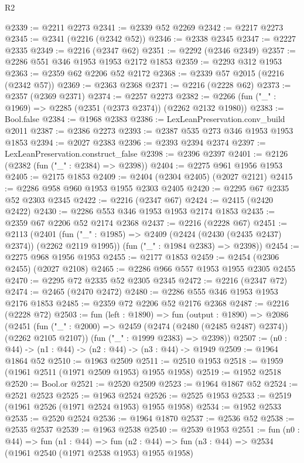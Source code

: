 \begin{lexlean}{R2}
\begin{coremodule}
@2339 := @2211 @2273
@2341 := @2339 @52 @2269
@2342 := @2217 @2273
@2345 := @2341 (@2216 (@2342 @52))
@2346 := @2338 @2345
@2347 := @2227 @2335
@2349 := @2216 (@2347 @62)
@2351 := @2292 (@2346 @2349)
@2357 := @2286 @551 @346 @1953 @1953 @2172 @1853
@2359 := @2293 @312 @1953
@2363 := @2359 @62 @2206 @52 @2172
@2368 := @2339 @57 @2015 (@2216 (@2342 @57))
@2369 := @2363 @2368
@2371 := @2216 (@2228 @62)
@2373 := @2357 (@2369 @2371)
@2374 := @2257 @2273
@2382 := @2266 (fun ("_" : @1969) => @2285 (@2351 (@2373 @2374)) (@2262 @2132 @1980))
@2383 := Bool.false
@2384 := @1968 @2383
@2386 := LexLeanPreservation.conv_build @2011
@2387 := @2386 @2273
@2393 := @2387 @535 @273 @346 @1953 @1953 @1853
@2394 := @2027 @2383
@2396 := @2393 @2394 @2374
@2397 := LexLeanPreservation.construct_false
@2398 := @2396 @2397
@2401 := @2126 (@2382 (fun ("_" : @2384) => @2398))
@2404 := @2275 @961 @1956 @1953
@2405 := @2175 @1853
@2409 := @2404 (@2304 @2405) (@2027 @2121)
@2415 := @2286 @958 @960 @1953 @1955 @2303 @2405
@2420 := @2295 @67 @2335 @52 @2303 @2345
@2422 := @2216 (@2347 @67)
@2424 := @2415 (@2420 @2422)
@2430 := @2286 @553 @346 @1953 @1953 @2174 @1853
@2435 := @2359 @67 @2206 @52 @2174 @2368
@2437 := @2216 (@2228 @67)
@2451 := @2113
    (@2401
      (fun ("_" : @1985) => @2409 (@2424 (@2430 (@2435 @2437) @2374)) (@2262 @2119 @1995))
      (fun ("_" : @1984 @2383) => @2398))
@2454 := @2275 @968 @1956 @1953
@2455 := @2177 @1853
@2459 := @2454 (@2306 @2455) (@2027 @2108)
@2465 := @2286 @966 @557 @1953 @1955 @2305 @2455
@2470 := @2295 @72 @2335 @52 @2305 @2345
@2472 := @2216 (@2347 @72)
@2474 := @2465 (@2470 @2472)
@2480 := @2286 @555 @346 @1953 @1953 @2176 @1853
@2485 := @2359 @72 @2206 @52 @2176 @2368
@2487 := @2216 (@2228 @72)
@2503 := fun (left : @1890) =>
  fun (output : @1890) =>
  @2086
    (@2451
      (fun ("_" : @2000) => @2459 (@2474 (@2480 (@2485 @2487) @2374)) (@2262 @2105 @2107))
      (fun ("_" : @1999 @2383) => @2398))
@2507 := (n0 : @44) -> (n1 : @44) -> (n2 : @44) -> (n3 : @44) -> @1949
@2509 := @1964 @1864 @52
@2510 := @1963 @2509
@2511 := @2510 @1953
@2518 := @1959 (@1961 @2511 (@1971 @2509 @1953) @1955 @1958)
@2519 := @1952 @2518
@2520 := Bool.or
@2521 := @2520 @2509
@2523 := @1964 @1867 @52
@2524 := @2521 @2523
@2525 := @1963 @2524
@2526 := @2525 @1953
@2533 := @2519 (@1961 @2526 (@1971 @2524 @1953) @1955 @1958)
@2534 := @1952 @2533
@2535 := @2520 @2524
@2536 := @1964 @1870
@2537 := @2536 @52
@2538 := @2535 @2537
@2539 := @1963 @2538
@2540 := @2539 @1953
@2551 := fun (n0 : @44) =>
  fun (n1 : @44) =>
  fun (n2 : @44) => fun (n3 : @44) => @2534 (@1961 @2540 (@1971 @2538 @1953) @1955 @1958)

\end{coremodule}
\end{lexlean}
